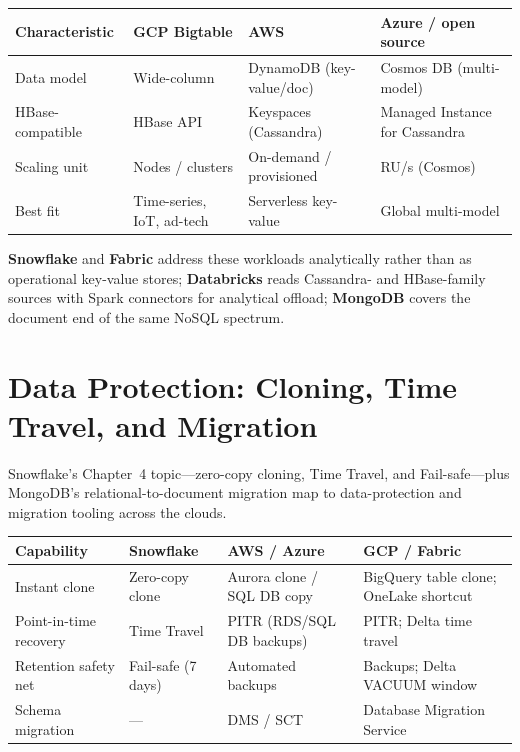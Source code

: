 \begin{center}
\footnotesize
\begin{tabular}{@{}p{2.8cm}p{3.0cm}p{3.0cm}p{3.4cm}@{}}
\toprule
\textbf{Characteristic} & \textbf{GCP Bigtable} & \textbf{AWS} & \textbf{Azure / open source} \\
\midrule
Data model & Wide-column & DynamoDB (key-value/doc) & Cosmos DB (multi-model) \\
HBase-compatible & HBase API & Keyspaces (Cassandra) & Managed Instance for Cassandra \\
Scaling unit & Nodes / clusters & On-demand / provisioned & RU/s (Cosmos) \\
Best fit & Time-series, IoT, ad-tech & Serverless key-value & Global multi-model \\
\bottomrule
\end{tabular}
\end{center}

\noindent \textbf{Snowflake} and \textbf{Fabric} address these workloads analytically rather than as
operational key-value stores; \textbf{Databricks} reads Cassandra- and HBase-family sources with
Spark connectors for analytical offload; \textbf{MongoDB} covers the document end of the same
NoSQL spectrum.

\section{Data Protection: Cloning, Time Travel, and Migration}
%
Snowflake's Chapter~4 topic---zero-copy cloning, Time Travel, and Fail-safe---plus MongoDB's
relational-to-document migration map to data-protection and migration tooling across the clouds.

\begin{center}
\footnotesize
\begin{tabular}{@{}p{2.8cm}p{3.0cm}p{3.0cm}p{3.4cm}@{}}
\toprule
\textbf{Capability} & \textbf{Snowflake} & \textbf{AWS / Azure} & \textbf{GCP / Fabric} \\
\midrule
Instant clone & Zero-copy clone & Aurora clone / SQL DB copy & BigQuery table clone; OneLake shortcut \\
Point-in-time recovery & Time Travel & PITR (RDS/SQL DB backups) & PITR; Delta time travel \\
Retention safety net & Fail-safe (7 days) & Automated backups & Backups; Delta VACUUM window \\
Schema migration & --- & DMS / SCT & Database Migration Service \\
\bottomrule
\end{tabular}
\end{center}

